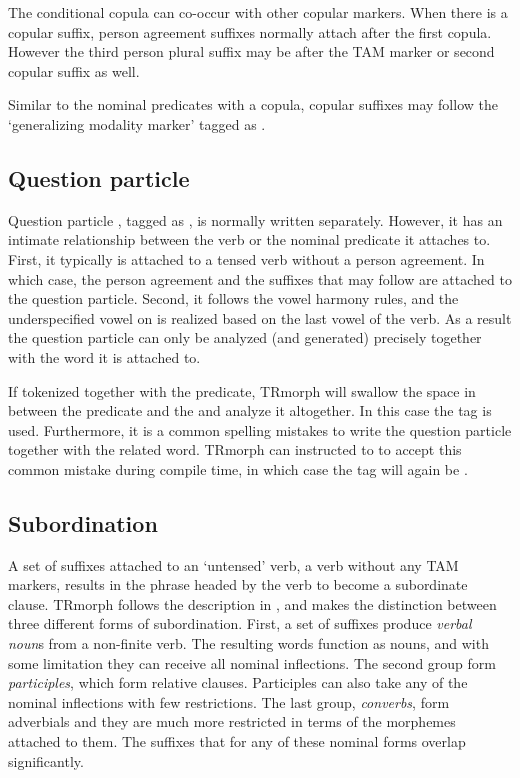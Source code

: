 \documentclass[twocolumn]{article}
\begin{document}
The conditional copula  can co-occur with other copular
markers. When there is a copular suffix, person agreement suffixes
normally attach after the first copula. However the third person
plural suffix may be after the TAM marker or second copular suffix as
well.

Similar to the nominal predicates with a copula, copular suffixes may
follow the `generalizing modality marker'  tagged as
.

\subsection{Question particle}

Question particle , tagged as , is normally
written separately. However, it has an intimate relationship between
the verb or the nominal predicate it attaches to. First, it typically
is attached to a tensed verb without a person agreement. In which
case, the person agreement and the suffixes that may follow are
attached to the question particle. Second, it follows the vowel
harmony rules, and the underspecified vowel on  is realized
based on the last vowel of the verb.   As a result the question particle can only be
analyzed (and generated) precisely together with the word it is
attached to.

If tokenized together with the predicate, TRmorph will swallow the
space in between the predicate and the  and analyze it
altogether. In this case the tag  is used. Furthermore,
it is a common spelling mistakes to write the question particle
together with the related word. TRmorph can instructed to 
to accept this common mistake during compile time, in which case the
tag will again be .

\subsection{\label{ssec:subordination}Subordination}

A set of suffixes attached to an `untensed' verb, a verb without any
TAM markers, results in the phrase headed by the verb to become a
subordinate clause. TRmorph follows the description in
\cite{goksel2005}, and makes the distinction between three different
forms of subordination. First, a set of suffixes produce \emph{verbal
noun}s from a non-finite verb. The resulting words function as nouns,
and with some limitation they can receive all nominal inflections. The
second group form \emph{participles}, which form relative clauses.
Participles can also take any of the nominal inflections with few
restrictions. The last group, \emph{converbs}, form adverbials and
they are much more restricted in terms of the morphemes attached to
them. The suffixes that for any of these nominal forms overlap
significantly.
\end{document}
